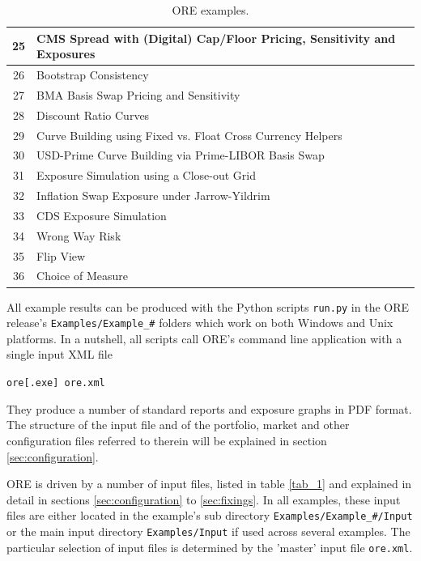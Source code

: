 \documentclass[12pt, a4paper]{article}
\begin{document}
{\begin{table}[hbt]
\begin{center}
\begin{tabular}{|c|l|}
\hline
25 & CMS Spread with (Digital) Cap/Floor Pricing, Sensitivity and Exposures\\
\hline
26 & Bootstrap Consistency\\
\hline
27 & BMA Basis Swap Pricing and Sensitivity\\
\hline
28 & Discount Ratio Curves\\
\hline
29 & Curve Building using Fixed vs. Float Cross Currency Helpers\\
\hline
30 & USD-Prime Curve Building via Prime-LIBOR Basis Swap\\
\hline
31 & Exposure Simulation using a Close-out Grid\\
\hline
32 & Inflation Swap Exposure under Jarrow-Yildrim\\ 
\hline
33 & CDS Exposure Simulation \\
\hline
34 & Wrong Way Risk \\
\hline
35 & Flip View \\
\hline
36 & Choice of Measure \\
\hline
\end{tabular}
\caption{ORE examples.}
\label{tab_0}
\end{center}
\end{table}

All example results can be produced with the Python scripts {\tt run.py} in the ORE release's {\tt Examples/Example\_\#}
folders which work on both Windows and Unix platforms. In a nutshell, all scripts call ORE's command line application
with a single input XML file

\medskip
\centerline{\tt ore[.exe] ore.xml}
\medskip

They produce a number of standard reports and exposure graphs in PDF format. The structure of the input file and of the
portfolio, market and other configuration files referred to therein will be explained in section
\ref{sec:configuration}.

\medskip ORE is driven by a number of input files, listed in table \ref{tab_1} and explained in detail in sections
\ref{sec:configuration} to \ref{sec:fixings}. In all examples, these input files are either located in the example's sub
directory {\tt Examples/Example\_\#/Input} or the main input directory {\tt Examples/Input} if used across several
examples. The particular selection of input files is determined by the 'master' input file {\tt ore.xml}.

}
\end{document}
